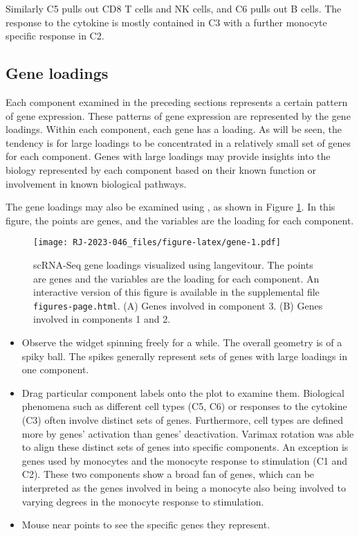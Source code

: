 Similarly
C5
pulls out CD8 T cells and NK cells, and
C6
pulls out B cells.
The response to the cytokine is mostly contained in
C3
with a further monocyte specific response in
C2.

\hypertarget{geneloadings}{%
\subsection{Gene loadings}\label{geneloadings}}

Each component examined in the preceding sections represents a certain pattern of gene expression. These patterns of gene expression are represented by the gene loadings. Within each component, each gene has a loading. As will be seen, the tendency is for large loadings to be concentrated in a relatively small set of genes for each component. Genes with large loadings may provide insights into the biology represented by each component based on their known function or involvement in known biological pathways.

The gene loadings may also be examined using , as shown in Figure \ref{fig:gene}. In this figure, the points are genes, and the variables are the loading for each component.

\begin{figure}
\centering
\texttt{[image: RJ-2023-046\_files/figure-latex/gene-1.pdf]}
\caption{\label{fig:gene}scRNA-Seq gene loadings visualized using langevitour. The points are genes and the variables are the loading for each component. An interactive version of this figure is available in the supplemental file \texttt{figures-page.html}. (A) Genes involved in component 3. (B) Genes involved in components 1 and 2.}
\end{figure}

\begin{itemize}
\item
  Observe the widget spinning freely for a while. The overall geometry is of a spiky ball. The spikes generally represent sets of genes with large loadings in one component.
\item
  Drag particular component labels onto the plot to examine them. Biological phenomena such as different cell types (C5, C6) or responses to the cytokine (C3)
  often involve distinct sets of genes. Furthermore, cell types are defined more by genes' activation than genes' deactivation. Varimax rotation was able to align these distinct sets of genes into specific components. An exception is genes used by monocytes and the monocyte response to stimulation (C1 and C2). These two components show a broad fan of genes, which can be interpreted as the genes involved in being a monocyte also being involved to varying degrees in the monocyte response to stimulation.
\item
  Mouse near points to see the specific genes they represent.
\end{itemize}


